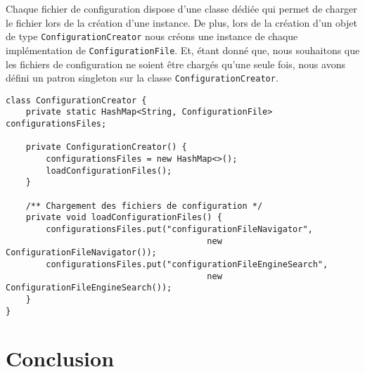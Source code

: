 \documentclass[10pt,a4paper]{article}
\begin{document}
\begin{center}
\end{center}

Chaque fichier de configuration dispose d'une classe dédiée qui permet de charger le fichier lors de la création d'une instance. De plus, lors de la création d'un objet de type \verb|ConfigurationCreator| nous créons une instance de chaque implémentation de \verb|ConfigurationFile|. Et, étant donné que, nous souhaitons que les fichiers de configuration ne soient être chargés qu'une seule fois, nous avons défini un patron singleton sur la classe \verb|ConfigurationCreator|.

\begin{lstlisting}
class ConfigurationCreator {
	private static HashMap<String, ConfigurationFile> configurationsFiles;
		
	private ConfigurationCreator() {
		configurationsFiles = new HashMap<>();
		loadConfigurationFiles();
	}	
	
	/** Chargement des fichiers de configuration */
	private void loadConfigurationFiles() {
		configurationsFiles.put("configurationFileNavigator", 
		                                new ConfigurationFileNavigator());
		configurationsFiles.put("configurationFileEngineSearch", 
		                                new ConfigurationFileEngineSearch());
	}
}
\end{lstlisting}

\section{Conclusion}

\newpage
\end{document}
